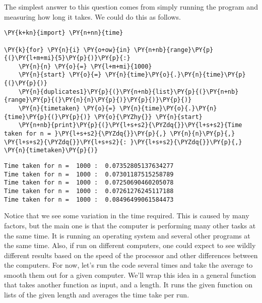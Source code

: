 The simplest answer to this question comes from simply running the program and measuring how long it takes.
We could do this as follows.


\begin{Verbatim}[commandchars=\\\{\}]
\PY{k+kn}{import} \PY{n+nn}{time}

\PY{k}{for} \PY{n}{i} \PY{o+ow}{in} \PY{n+nb}{range}\PY{p}{(}\PY{l+m+mi}{5}\PY{p}{)}\PY{p}{:}
    \PY{n}{n} \PY{o}{=} \PY{l+m+mi}{1000}
    \PY{n}{start} \PY{o}{=} \PY{n}{time}\PY{o}{.}\PY{n}{time}\PY{p}{(}\PY{p}{)}
    \PY{n}{duplicates1}\PY{p}{(}\PY{n+nb}{list}\PY{p}{(}\PY{n+nb}{range}\PY{p}{(}\PY{n}{n}\PY{p}{)}\PY{p}{)}\PY{p}{)}
    \PY{n}{timetaken} \PY{o}{=} \PY{n}{time}\PY{o}{.}\PY{n}{time}\PY{p}{(}\PY{p}{)} \PY{o}{\PYZhy{}} \PY{n}{start}
    \PY{n+nb}{print}\PY{p}{(}\PY{l+s+s2}{\PYZdq{}}\PY{l+s+s2}{Time taken for n = }\PY{l+s+s2}{\PYZdq{}}\PY{p}{,} \PY{n}{n}\PY{p}{,} \PY{l+s+s2}{\PYZdq{}}\PY{l+s+s2}{: }\PY{l+s+s2}{\PYZdq{}}\PY{p}{,} \PY{n}{timetaken}\PY{p}{)}
\end{Verbatim}

\begin{Verbatim}
Time taken for n =  1000 :  0.07352805137634277
Time taken for n =  1000 :  0.07301187515258789
Time taken for n =  1000 :  0.07250690460205078
Time taken for n =  1000 :  0.07261276245117188
Time taken for n =  1000 :  0.08496499061584473

\end{Verbatim}




Notice that we see some variation in the time required.
This is caused by many factors, but the main one is that the computer is performing many other tasks at the same time.
It is running an operating system and several other programs at the same time.
Also, if run on different computers, one could expect to see wildly different results based on the speed of the processor and other differences between the computers.
For now, let's run the code several times and take the average to smooth them out for a given computer.
We'll wrap this idea in a general function that takes another function as input, and a length.
It runs the given function on lists of the given length and averages the time take per run.

